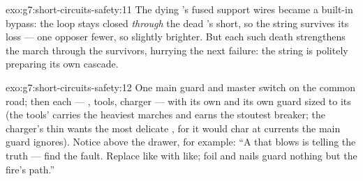 \begin{solution}{exo:g7:short-circuits-safety:11}
The dying 's fused support wires became a built-in bypass:
the loop stays closed \emph{through} the dead 's short, so
the string survives its loss --- one opposer fewer, so slightly
brighter. But each such death strengthens the march through the
survivors, hurrying the next failure: the string is politely
preparing its own cascade.
\end{solution}

\begin{solution}{exo:g7:short-circuits-safety:12}
One main guard and master switch on the common road; then each
 --- , tools, charger --- with its own  and
its own guard sized to its  (the tools'  carries the
heaviest marches and earns the stoutest breaker; the charger's
thin  wants the most delicate , for it would char at
currents the main guard ignores). Notice above the drawer, for
example: ``A  that blows is telling the truth --- find the
fault. Replace like with like; foil and nails guard nothing but
the fire's path.''
\end{solution}

